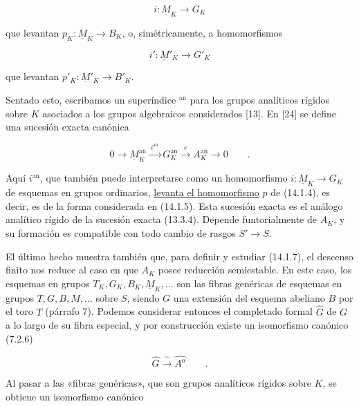 \begin{equation}\tag{14.1.5}
 i:\underline M_K\longrightarrow G_K
\end{equation}

\noindent
que levantan $p_K:\underline M_K\longrightarrow B_K$, o,
simétricamente, a homomorfismos

\begin{equation}\tag{14.1.6}
 i':\underline M'_K\longrightarrow G'_K
\end{equation}

\noindent
que levantan $p'_K:\underline M'_K\longrightarrow B'_K$.

Sentado esto, escribamos un superíndice ${}^{\mathrm{an}}$ para los
grupos analíticos rígidos sobre $K$ asociados a los grupos algebraicos
considerados [13]. En [24] se define una sucesión exacta canónica

\begin{equation}\tag{14.1.7}
 0\longrightarrow\underline M_K^{\mathrm{an}}
 \xrightarrow{\ i^{\mathrm{an}}\ }G_K^{\mathrm{an}}
 \xrightarrow{\ e\ }A_K^{\mathrm{an}}\longrightarrow0\qquad .
\end{equation}

\noindent
Aquí $i^{\mathrm{an}}$, que también puede interpretarse como un
homomorfismo $i:\underline M_K\longrightarrow G_K$ de esquemas en
grupos ordinarios, \underline{levanta el homomorfismo} $p$ de (14.1.4),
es decir, es de la forma considerada en (14.1.5). Esta sucesión exacta
es el análogo analítico rígido de la sucesión exacta (13.3.4). Depende
funtorialmente de $A_K$, y su formación es compatible con todo cambio
de rasgos $S'\longrightarrow S$.

El último hecho muestra también que, para definir y estudiar (14.1.7),
el descenso finito nos reduce al caso en que $A_K$ posee reducción
semiestable. En este caso, los esquemas en grupos
$T_K,G_K,B_K,\underline M_K,\ldots$ son las fibras genéricas de
esquemas en grupos $T,G,B,M,\ldots$ sobre $S$, siendo $G$ una extensión
del esquema abeliano $B$ por el toro $T$ (párrafo 7). Podemos considerar
entonces el completado formal $\hat G$ de $G$ a lo largo de su fibra
especial, y por construcción existe un isomorfismo canónico (7.2.6)

\begin{equation}\tag{14.1.8}
 \hat G\xrightarrow{\ \sim\ }\widehat{A^{\mathrm o}}
 \qquad .
\end{equation}

\noindent
Al pasar a las «fibras genéricas», que son grupos analíticos rígidos
sobre $K$, se obtiene un isomorfismo canónico

